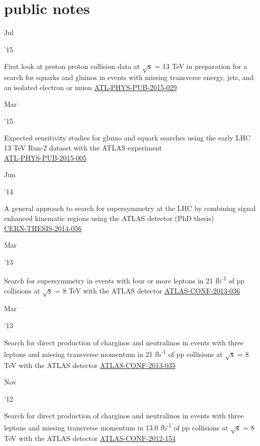 \documentclass[]{cv} %
\begin{document}
\section{public notes}
\begin{entrylist}

  \entry
  {\parbox[t]{\parboxWidthOne}{Jul}\parbox[t]{\parboxWidthTwo}{\hfill '15}}
  {First look at proton proton collision data at $\sqrt{\mathsf{s}}$ = 13 TeV in
  preparation for a search for squarks and gluinos in events with missing
  transverse energy, jets, and an isolated electron or muon}
  {\href{https://cds.cern.ch/record/2037906}{ATL-PHYS-PUB-2015-029}}
  {\vspace*{\spacingPubs}}

  \entry
  {\parbox[t]{\parboxWidthOne}{Mar}\parbox[t]{\parboxWidthTwo}{\hfill '15}}
  {Expected sensitivity studies for gluino and squark searches using the early
  LHC 13 TeV Run-2 dataset with the ATLAS experiment\\}
  {\href{https://cds.cern.ch/record/2002608/}{ATL-PHYS-PUB-2015-005}}
  {\vspace*{\spacingPubs}}

  \entry
  {\parbox[t]{\parboxWidthOne}{Jun}\parbox[t]{\parboxWidthTwo}{\hfill '14}}
  {A general approach to search for supersymmetry at the LHC by combining signal
  enhanced kinematic regions using the ATLAS detector (PhD thesis)\\}
  {\href{https://cds.cern.ch/record/1709233/}{CERN-THESIS-2014-056}}
  {\vspace*{\spacingPubs}}

  \entry
  {\parbox[t]{\parboxWidthOne}{Mar}\parbox[t]{\parboxWidthTwo}{\hfill '13}}
  {Search for supersymmetry in events with four or more leptons in 21 fb\textsuperscript{-1} of pp collisions at
  $\sqrt{\mathsf{s}}$ = 8 TeV with the ATLAS detector}
  {\href{https://cds.cern.ch/record/1532429}{ATLAS-CONF-2013-036}}
  {\vspace*{\spacingPubs}}

  \entry
  {\parbox[t]{\parboxWidthOne}{Mar}\parbox[t]{\parboxWidthTwo}{\hfill '13}}
  {Search for direct production of charginos and neutralinos in events with three leptons and missing transverse momentum in 21
    fb\textsuperscript{-1} of pp collisions at $\sqrt{\mathsf{s}}$ = 8 TeV with the ATLAS detector}
    {\href{https://cds.cern.ch/record/1532426}{ATLAS-CONF-2013-035}}
    {\vspace*{\spacingPubs}}

    \entry
    {\parbox[t]{\parboxWidthOne}{Nov}\parbox[t]{\parboxWidthTwo}{\hfill '12}}
    {Search for direct production of charginos and neutralinos in events with three leptons and missing transverse momentum in 13.0
      fb\textsuperscript{-1} of pp collisions at $\sqrt{\mathsf{s}}$ = 8 TeV with the ATLAS detector}
      {\href{https://cds.cern.ch/record/1493493}{ATLAS-CONF-2012-154}}
      {\vspace*{\spacingPubs}}


\end{entrylist}
\end{document}
